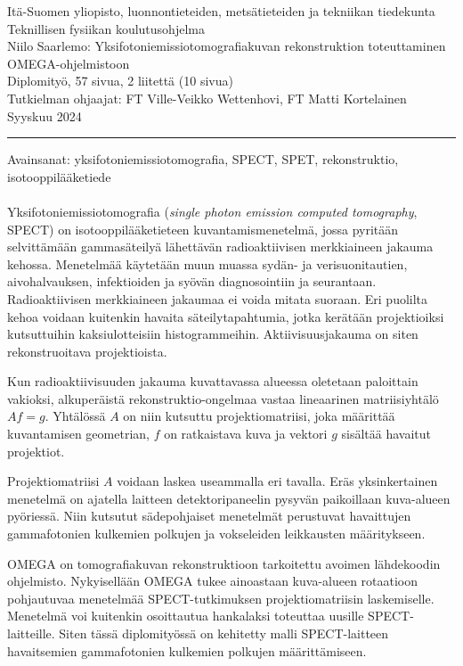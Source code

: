 \begin{titlepage}
    \noindent
    Itä-Suomen yliopisto, luonnontieteiden, metsätieteiden ja tekniikan tiedekunta\\
    Teknillisen fysiikan koulutusohjelma\\
    Niilo Saarlemo: Yksifotoniemissiotomografiakuvan rekonstruktion toteuttaminen OMEGA-ohjelmistoon\\
    Diplomityö, 57 sivua, 2 liitettä (10 sivua)\\
    Tutkielman ohjaajat: FT Ville-Veikko Wettenhovi, FT Matti Kortelainen\\
    Syyskuu 2024\\

    \hrule

    \vspace{4pt}\noindent
    Avainsanat: yksifotoniemissiotomografia, SPECT, SPET, rekonstruktio, isotooppilääketiede\\
    \vspace{24pt}\\
    \noindent
    Yksifotoniemissiotomografia (\textit{single photon emission computed tomography}, SPECT) on isotooppilääketieteen kuvantamismenetelmä, jossa pyritään selvittämään gammasäteilyä lähettävän radioaktiivisen merkkiaineen jakauma kehossa. Menetelmää käytetään muun muassa sydän- ja verisuonitautien, aivohalvauksen, infektioiden ja syövän diagnosointiin ja seurantaan. Radioaktiivisen merkkiaineen jakaumaa ei voida mitata suoraan. Eri puolilta kehoa voidaan kuitenkin havaita säteilytapahtumia, jotka kerätään projektioiksi kutsuttuihin kaksiulotteisiin histogrammeihin. Aktiivisuusjakauma on siten rekonstruoitava projektioista.

    Kun radioaktiivisuuden jakauma kuvattavassa alueessa oletetaan paloittain vakioksi, alkuperäistä rekonstruktio-ongelmaa vastaa lineaarinen matriisiyhtälö $Af=g$. Yhtälössä $A$ on niin kutsuttu projektiomatriisi, joka määrittää kuvantamisen geometrian, $f$ on ratkaistava kuva ja vektori $g$ sisältää havaitut projektiot.

    Projektiomatriisi $A$ voidaan laskea useammalla eri tavalla. Eräs yksinkertainen menetelmä on ajatella laitteen detektoripaneelin pysyvän paikoillaan kuva-alueen pyöriessä. Niin kutsutut sädepohjaiset menetelmät perustuvat havaittujen gammafotonien kulkemien polkujen ja vokseleiden leikkausten määritykseen.

    OMEGA on tomografiakuvan rekonstruktioon tarkoitettu avoimen lähdekoodin ohjelmisto. Nykyisellään OMEGA tukee ainoastaan kuva-alueen rotaatioon pohjautuvaa menetelmää SPECT-tutkimuksen projektiomatriisin laskemiselle. Menetelmä voi kuitenkin osoittautua hankalaksi toteuttaa uusille SPECT-laitteille. Siten tässä diplomityössä on kehitetty malli SPECT-laitteen havaitsemien gammafotonien kulkemien polkujen määrittämiseen.


\end{titlepage}
